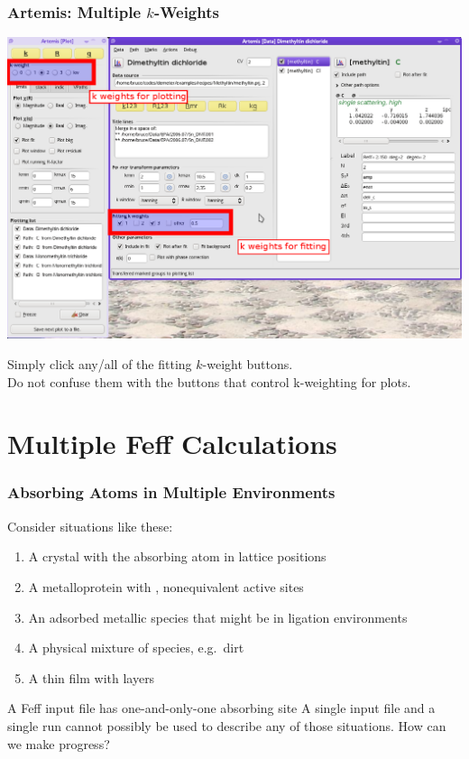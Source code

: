 \documentclass[10pt, xcolor=x11names, compress]{beamer}
\begin{document}
\begin{frame}
  \frametitle{Artemis: Multiple $k$-Weights}
  
  \begin{center}
    \includegraphics[width=0.9\linewidth]{artemis/mkw.png}

    Simply click any/all of the fitting $k$-weight buttons.\\
    Do not confuse them with the buttons that control k-weighting for
    plots.
  \end{center}
\end{frame}

\section[MFC]{Multiple Feff Calculations}
\begin{frame}
  \frametitle{Absorbing Atoms in Multiple Environments}

  Consider situations like these:
  \begin{enumerate}
  \item A crystal with the absorbing atom in {\multiple} lattice
    positions
  \item A metalloprotein with {\multiple}, nonequivalent active sites
  \item An adsorbed metallic species that might be in {\multiple}
    ligation environments
  \item A physical mixture of {\multiple} species, e.g.\ dirt
  \item A thin film with {\multiple} layers
  \end{enumerate}

  \bigskip

  \begin{block}{A Feff input file has one-and-only-one absorbing
      site}
    A single {\feff} input file and a single {\feff} run cannot
    possibly be used to describe any of those situations.  How can we
    make progress?
  \end{block}
\end{frame}
\end{document}

